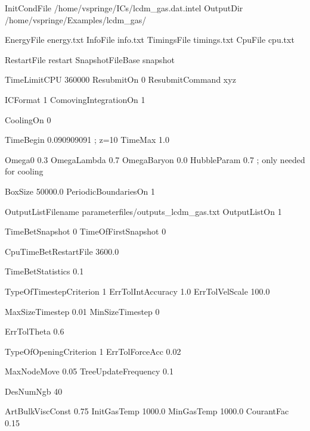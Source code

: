 
InitCondFile  		/home/vspringe/ICs/lcdm_gas.dat.intel
OutputDir               /home/vspringe/Examples/lcdm_gas/

EnergyFile        energy.txt
InfoFile          info.txt
TimingsFile       timings.txt
CpuFile           cpu.txt

RestartFile       restart
SnapshotFileBase  snapshot



TimeLimitCPU      360000
ResubmitOn        0
ResubmitCommand   xyz



ICFormat              1
ComovingIntegrationOn 1

CoolingOn 0


TimeBegin           0.090909091  ; z=10
TimeMax	            1.0

Omega0	              0.3
OmegaLambda           0.7
OmegaBaryon           0.0
HubbleParam           0.7   ; only needed for cooling

BoxSize                50000.0
PeriodicBoundariesOn   1



OutputListFilename   parameterfiles/outputs_lcdm_gas.txt
OutputListOn        1

TimeBetSnapshot        0
TimeOfFirstSnapshot    0
 
CpuTimeBetRestartFile  3600.0

TimeBetStatistics      0.1



TypeOfTimestepCriterion 1
ErrTolIntAccuracy       1.0
ErrTolVelScale          100.0

MaxSizeTimestep        0.01 
MinSizeTimestep        0



ErrTolTheta            0.6            

TypeOfOpeningCriterion 1
ErrTolForceAcc         0.02


MaxNodeMove            0.05
TreeUpdateFrequency    0.1




DesNumNgb           40

ArtBulkViscConst    0.75
InitGasTemp         1000.0  %
MinGasTemp          1000.0    
CourantFac          0.15


